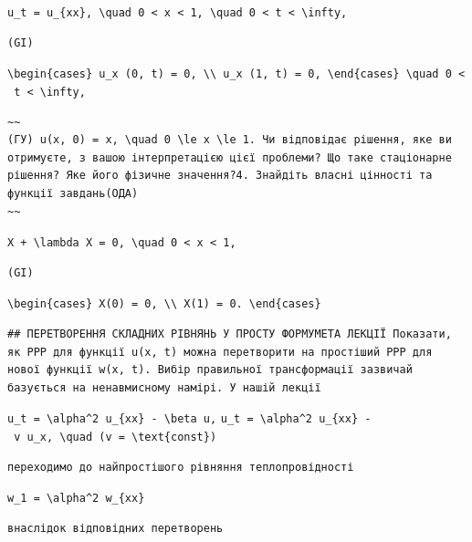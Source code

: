 \documentclass[
  ukrainian,
]{article}
\begin{document}
\texttt{u\_t\ =\ u\_\{xx\},\ \textbackslash{}quad\ 0\ \textless{}\ x\ \textless{}\ 1,\ \textbackslash{}quad\ 0\ \textless{}\ t\ \textless{}\ \textbackslash{}infty,}

\begin{verbatim}
(GI)
\end{verbatim}

\texttt{\textbackslash{}begin\{cases\}\ u\_x\ (0,\ t)\ =\ 0,\ \textbackslash{}\textbackslash{}\ u\_x\ (1,\ t)\ =\ 0,\ \textbackslash{}end\{cases\}\ \textbackslash{}quad\ 0\ \textless{}\ t\ \textless{}\ \textbackslash{}infty,}

\begin{verbatim}
~~
(ГУ) u(x, 0) = x, \quad 0 \le x \le 1. Чи відповідає рішення, яке ви отримуєте, з вашою інтерпретацією цієї проблеми? Що таке стаціонарне рішення? Яке його фізичне значення?4. Знайдіть власні цінності та функції завдань(ОДА)
~~
\end{verbatim}

\texttt{X\textquotesingle{}\textquotesingle{}\ +\ \textbackslash{}lambda\ X\ =\ 0,\ \textbackslash{}quad\ 0\ \textless{}\ x\ \textless{}\ 1,}

\begin{verbatim}
(GI)
\end{verbatim}

\texttt{\textbackslash{}begin\{cases\}\ X\textquotesingle{}(0)\ =\ 0,\ \textbackslash{}\textbackslash{}\ X\textquotesingle{}(1)\ =\ 0.\ \textbackslash{}end\{cases\}}

\begin{verbatim}
## ПЕРЕТВОРЕННЯ СКЛАДНИХ РІВНЯНЬ У ПРОСТУ ФОРМУМЕТА ЛЕКЦІЇ Показати, як PPP для функції u(x, t) можна перетворити на простіший PPP для нової функції w(x, t). Вибір правильної трансформації зазвичай базується на ненавмисному намірі. У нашій лекції
\end{verbatim}

\texttt{u\_t\ =\ \textbackslash{}alpha\^{}2\ u\_\{xx\}\ -\ \textbackslash{}beta\ u,}
\texttt{u\_t\ =\ \textbackslash{}alpha\^{}2\ u\_\{xx\}\ -\ v\ u\_x,\ \textbackslash{}quad\ (v\ =\ \textbackslash{}text\{const\})}

\begin{verbatim}
переходимо до найпростішого рівняння теплопровідності
\end{verbatim}

\texttt{w\_1\ =\ \textbackslash{}alpha\^{}2\ w\_\{xx\}}

\begin{verbatim}
внаслідок відповідних перетворень
\end{verbatim}
\end{document}
